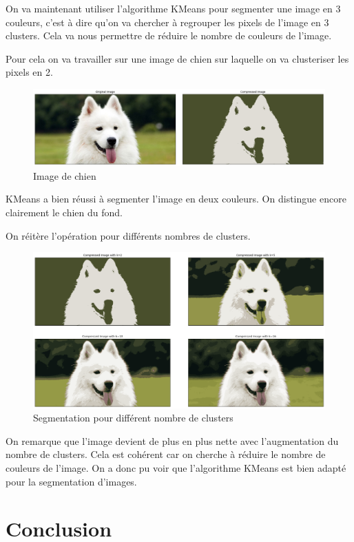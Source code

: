 \documentclass[french,a4paper,18pt]{article}
\begin{document}
On va maintenant utiliser l'algorithme KMeans pour segmenter une image en 3 couleurs,
c'est à dire qu'on va chercher à regrouper les pixels de l'image en 3 clusters.
Cela va nous permettre de réduire le nombre de couleurs de l'image.

Pour cela on va travailler sur une image de chien sur laquelle on va clusteriser
les pixels en 2.
\begin{figure}[h!]
    \centering
    \includegraphics[scale=0.2]{images/dog_compressed.png}
    \caption{Image de chien}\label{fig:dog}
\end{figure}


KMeans a bien réussi à segmenter l'image en deux couleurs. On distingue encore clairement le chien du fond.

On réitère l'opération pour différents nombres de clusters.

\begin{figure}[h!]
    \centering
    \includegraphics[scale=0.2]{images/dog_segmented_comparaison.png}
    \caption{Segmentation pour différent nombre de clusters}\label{fig:dog_kmeans}
\end{figure}

On remarque que l'image devient de plus en plus nette avec l'augmentation du nombre de clusters.
Cela est cohérent car on cherche à réduire le nombre de couleurs de l'image.
On a donc pu voir que l'algorithme KMeans est bien adapté pour la segmentation d'images.

\section{Conclusion}
\end{document}
